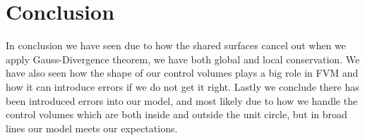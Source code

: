 \section{Conclusion}
In conclusion we have seen due to how the shared surfaces cancel out when we apply Gauss-Divergence theorem, we have both global and local conservation. We have also seen how the shape of our control volumes plays a big role in FVM and how it can introduce errors if we do not get it right. Lastly we conclude there has been introduced errors into our model, and most likely due to how we handle the control volumes which are both inside and outside the unit circle, but in broad lines our model meets our expectations.
